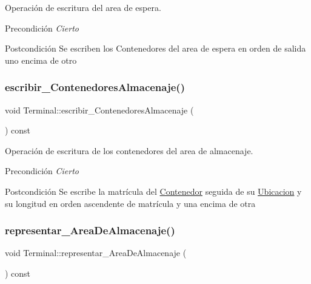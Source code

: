 Operación de escritura del area de espera. 

\begin{DoxyPrecond}{Precondición}
{\itshape Cierto} 
\end{DoxyPrecond}
\begin{DoxyPostcond}{Postcondición}
Se escriben los Contenedores del area de espera en orden de salida uno encima de otro 
\end{DoxyPostcond}
\mbox{\label{class_terminal_a24c74e2dd8c8e41452a7e890bc925f0e}} 
\subsubsection{\texorpdfstring{escribir\+\_\+\+Contenedores\+Almacenaje()}{escribir\_ContenedoresAlmacenaje()}}
{\footnotesize\ttfamily void Terminal\+::escribir\+\_\+\+Contenedores\+Almacenaje (\begin{DoxyParamCaption}{ }\end{DoxyParamCaption}) const}



Operación de escritura de los contenedores del area de almacenaje. 

\begin{DoxyPrecond}{Precondición}
{\itshape Cierto} 
\end{DoxyPrecond}
\begin{DoxyPostcond}{Postcondición}
Se escribe la matrícula del \hyperlink{class_contenedor}{Contenedor} seguida de su \hyperlink{class_ubicacion}{Ubicacion} y su longitud en orden ascendente de matrícula y una encima de otra 
\end{DoxyPostcond}
\mbox{\label{class_terminal_a32d375e8cecdafbbf0a291f646456dd6}} 
\subsubsection{\texorpdfstring{representar\+\_\+\+Area\+De\+Almacenaje()}{representar\_AreaDeAlmacenaje()}}
{\footnotesize\ttfamily void Terminal\+::representar\+\_\+\+Area\+De\+Almacenaje (\begin{DoxyParamCaption}{ }\end{DoxyParamCaption}) const}



